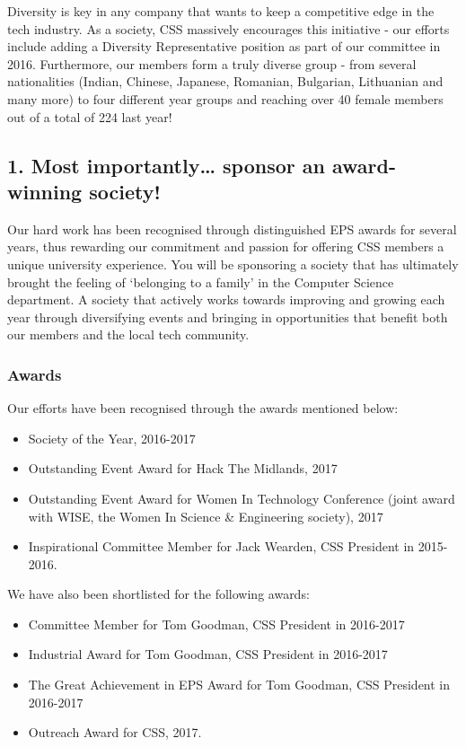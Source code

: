 \documentclass{article}
\begin{document}
Diversity is key in any company that wants to keep a competitive edge in the tech industry. As a society, CSS massively encourages this initiative - our efforts include adding a Diversity Representative position as part of our committee in 2016. 
Furthermore, our members form a truly diverse group - from several nationalities (Indian, Chinese, Japanese, Romanian, Bulgarian, Lithuanian and many more) to four different year groups and reaching over 40 female members out of a total of 224 last year! 

\subsection*{1. Most importantly… sponsor an award-winning society!}

Our hard work has been recognised through distinguished EPS awards for several years, thus rewarding our commitment and passion for offering CSS members a unique university experience. 
You will be sponsoring a society that has ultimately brought the feeling of ‘belonging to a family’ in the Computer Science department.
A society that actively works towards improving and growing each year through diversifying events and bringing in opportunities that benefit both our members and the local tech community.

\subsubsection*{Awards}

\noindent Our efforts have been recognised through the awards mentioned below:

\begin{itemize}
  \item Society of the Year, 2016-2017
  \item Outstanding Event Award for Hack The Midlands, 2017
  \item Outstanding Event Award for Women In Technology Conference (joint award with WISE, the Women In Science \& Engineering society), 2017
  \item Inspirational Committee Member for Jack Wearden, CSS President in 2015-2016.
\end{itemize}

\medskip

\noindent We have also been shortlisted for the following awards:
\begin{itemize}
  \item Committee Member for Tom Goodman, CSS President in 2016-2017
  \item Industrial Award for Tom Goodman, CSS President in 2016-2017
  \item The Great Achievement in EPS Award for Tom Goodman, CSS President in 2016-2017
  \item Outreach Award for CSS, 2017.
\end{itemize}
\end{document}
